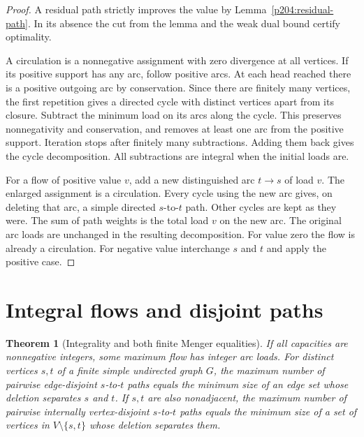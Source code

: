 \documentclass[11pt,oneside,openany]{book}
\theoremstyle{plain}
\newtheorem{theorem}{Theorem}[chapter]
\theoremstyle{definition}
\theoremstyle{remark}
\begin{document}
\begin{proof}
A residual path strictly improves the value by
Lemma~\ref{p204:residual-path}. In its absence the cut from the lemma
and the weak dual bound certify optimality.

A circulation is a nonnegative assignment with zero divergence at all
vertices. If its positive support has any arc, follow positive arcs.
At each head reached there is a positive outgoing arc by conservation.
Since there are finitely many vertices, the first repetition gives
a directed cycle with distinct vertices apart from its closure.
Subtract the minimum load on its arcs along the cycle. This preserves
nonnegativity and conservation, and removes at least one arc from the
positive support. Iteration stops after finitely many subtractions.
Adding them back gives the cycle decomposition. All subtractions
are integral when the initial loads are.

For a flow of positive value \(v\), add a new distinguished arc
\(t\to s\) of load \(v\). The enlarged assignment is a circulation.
Every cycle using the new arc gives, on deleting that arc, a simple
directed \(s\)-to-\(t\) path. Other cycles are kept as they were.
The sum of path weights is the total load \(v\) on the new arc.
The original arc loads are unchanged in the resulting decomposition.
For value zero the flow is already a circulation. For negative value
interchange \(s\) and \(t\) and apply the positive case.
\end{proof}

\section{Integral flows and disjoint paths}

\begin{theorem}[Integrality and both finite Menger equalities]
\label{p204:W48}
If all capacities are nonnegative integers, some maximum flow has
integer arc loads. For distinct vertices \(s,t\) of a finite simple
undirected graph \(G\), the maximum number of pairwise edge-disjoint
\(s\)-to-\(t\) paths equals the minimum size of an edge set whose
deletion separates \(s\) and \(t\). If \(s,t\) are also nonadjacent,
the maximum number of pairwise internally vertex-disjoint
\(s\)-to-\(t\) paths equals the minimum size of a set of vertices
in \(V\setminus\{s,t\}\) whose deletion separates them.
\end{theorem}
\end{document}
